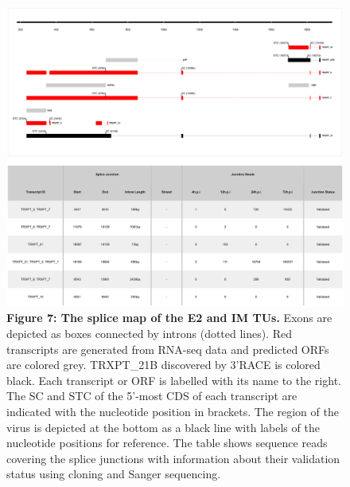 \documentclass[
]{article}
\begin{document}
\begin{figure}
\centering
\includegraphics{results/r/figures/figure7.png}
\caption{\textbf{Figure 7: The splice map of the E2 and IM TUs.} Exons
are depicted as boxes connected by introns (dotted lines). Red
transcripts are generated from RNA-seq data and predicted ORFs are
colored grey. TRXPT\_21B discovered by 3'RACE is colored black. Each
transcript or ORF is labelled with its name to the right. The SC and STC
of the 5'-most CDS of each transcript are indicated with the nucleotide
position in brackets. The region of the virus is depicted at the bottom
as a black line with labels of the nucleotide positions for reference.
The table shows sequence reads covering the splice junctions with
information about their validation status using cloning and Sanger
sequencing.}
\end{figure}
\end{document}
